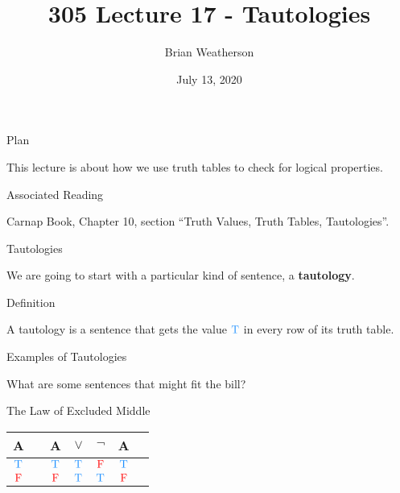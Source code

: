 \documentclass[
  ignorenonframetext,
]{beamer}
\title{305 Lecture 17 - Tautologies}
\author{Brian Weatherson}
\date{July 13, 2020}
\renewcommand{\,}{\text{, }}
\def\True{\textcolor{dodgerblue}{\text{T}}}
\def\False{\textcolor{red}{\text{F}}}
\begin{document}
\frame{\titlepage}

\begin{frame}{Plan}
\protect\hypertarget{plan}{}

This lecture is about how we use truth tables to check for logical
properties.

\end{frame}

\begin{frame}{Associated Reading}
\protect\hypertarget{associated-reading}{}

Carnap Book, Chapter 10, section ``Truth Values, Truth Tables,
Tautologies''.

\end{frame}

\begin{frame}{Tautologies}
\protect\hypertarget{tautologies}{}

We are going to start with a particular kind of sentence, a
\textbf{tautology}.

\end{frame}

\begin{frame}{Definition}
\protect\hypertarget{definition}{}

A tautology is a sentence that gets the value \(\True\) in every row of
its truth table.

\end{frame}

\begin{frame}{Examples of Tautologies}
\protect\hypertarget{examples-of-tautologies}{}

What are some sentences that might fit the bill?

\end{frame}

\begin{frame}{The Law of Excluded Middle}
\protect\hypertarget{the-law-of-excluded-middle}{}

\begin{center}
\begin{tabular}{@{ }c | c@{ }@{ }c@{ }@{ }c@{ }@{ }c@{ }@{ }c@{ }@{ }c}
A &  & A & $\lor$ & $\neg$ & A & \\
\hline 
$\True$ &  & $\True$ & \textcolor{red}{$\True$} & $\False$ & $\True$ & \\
$\False$ &  & $\False$ & \textcolor{red}{$\True$} & $\True$ & $\False$ & \\
\end{tabular}
\end{center}

\end{frame}
\end{document}
